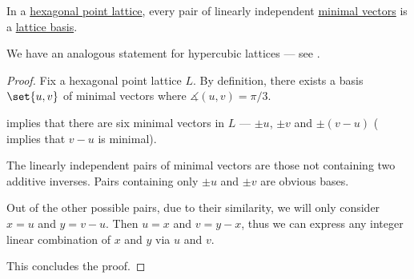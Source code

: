 \begin{corollary}\label{thm:hexagonal_point_lattice_minimal_basis}
  In a \hyperref[def:hexagonal_point_lattice]{hexagonal point lattice}, every pair of linearly independent \hyperref[def:minimal_lattice_vector]{minimal vectors} is a \hyperref[def:point_lattice_basis]{lattice basis}.
\end{corollary}
\begin{comments}
  \item We have an analogous statement for hypercubic lattices --- see .
\end{comments}
\begin{proof}
  Fix a hexagonal point lattice \( L \). By definition, there exists a basis \( \set{ u, v } \) of minimal vectors where \( \measuredangle(u, v) = \pi / 3 \).

   implies that there are six minimal vectors in \( L \) --- \( \pm u \), \( \pm v \) and \( \pm (v - u) \) ( implies that \( v - u \) is minimal).

  The linearly independent pairs of minimal vectors are those not containing two additive inverses. Pairs containing only \( \pm u \) and \( \pm v \) are obvious bases.

  Out of the other possible pairs, due to their similarity, we will only consider \( x = u \) and \( y = v - u \). Then \( u = x \) and \( v = y - x \), thus we can express any integer linear combination of \( x \) and \( y \) via \( u \) and \( v \).

  This concludes the proof.
\end{proof}

